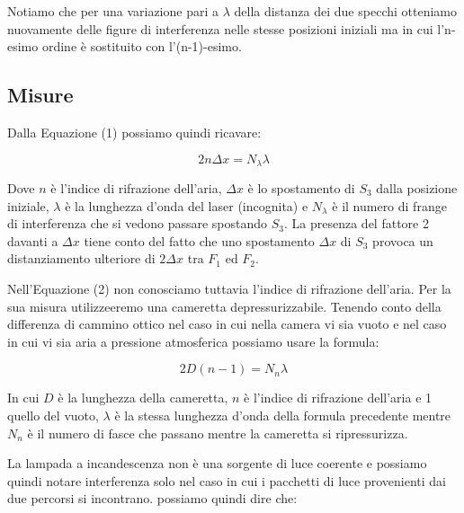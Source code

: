 \documentclass{article}
\begin{document}
\vspace{3mm}

Notiamo che per una variazione pari a $\lambda$ della distanza dei due specchi otteniamo nuovamente delle figure di interferenza nelle stesse posizioni iniziali ma in cui l'n-esimo ordine è sostituito con l'(n-1)-esimo.

\clearpage

\subsection{Misure}
Dalla Equazione (1) possiamo quindi ricavare:

\begin{equation} 
2 n \Delta{x} = N_\lambda \lambda 
\end{equation}

Dove $n$ è l'indice di rifrazione dell'aria, $\Delta{x}$ è lo spostamento di $S_3$ dalla posizione iniziale, $\lambda$ è la lunghezza d'onda del laser (incognita) e $N_\lambda$ è il numero di frange di interferenza che si vedono passare spostando $S_3$. La presenza del fattore 2 davanti a $\Delta{x}$ tiene conto del fatto che uno spostamento $\Delta x$ di $S_3$ provoca un distanziamento ulteriore di $2 \Delta x$ tra $F_1$ ed $F_2$.

\vspace{3mm}

Nell'Equazione (2) non conosciamo tuttavia l'indice di rifrazione dell'aria. Per la sua misura utilizzeeremo una cameretta depressurizzabile. Tenendo conto della differenza di cammino ottico nel caso in cui nella camera vi sia vuoto e nel caso in cui vi sia aria a pressione atmosferica possiamo usare la formula:

\begin{equation}
 2D (n - 1) = N_n \lambda
\end{equation}

In cui $D$ è la lunghezza della cameretta, $n$ è l'indice di rifrazione dell'aria e 1 quello del vuoto, $\lambda$ è la stessa lunghezza d'onda della formula precedente mentre $N_n$ è il numero di fasce  che passano mentre la cameretta si ripressurizza.

\vspace{3mm}

La lampada a incandescenza non è una sorgente di luce coerente e possiamo quindi notare interferenza solo nel caso in cui i pacchetti di luce provenienti dai due percorsi si incontrano. possiamo quindi dire che:
\end{document}
